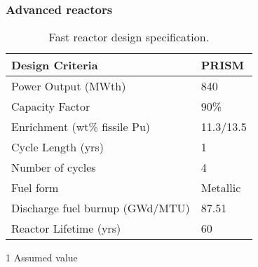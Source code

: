 \begin{frame}
    \frametitle{Advanced reactors}
    \vspace{-0.2cm}
    \begingroup
        \renewcommand{\arraystretch}{1.5}
        \begin{table}
            \centering
            \begin{threeparttable}
        
            \caption{Fast reactor design specification.}
            \label{tab:fast_rx}
            \begin{tabular}{l l}
                \hline
                Design Criteria & PRISM \cite{triplett_prism:_2012,fichtlscherer_assessing_2019}\\
                \hline
                Power Output (MWth) & 840 \\
                Capacity Factor & 90\%\tnote{1} \\
                Enrichment (wt\% fissile Pu) &  11.3/13.5\\
                Cycle Length (yrs) & 1 \\
                Number of cycles &  4\\
                Fuel form &  Metallic \\
                Discharge fuel burnup (GWd/MTU) & 87.51 \\
                Reactor Lifetime (yrs)&  60\\
                \hline
            \end{tabular}
            \begin{tablenotes}
                \item [1] Assumed value
            \end{tablenotes}
        \end{threeparttable}
        \end{table} 
    \endgroup
\end{frame}
